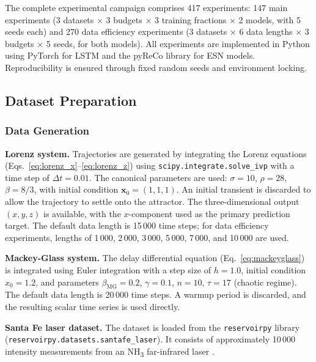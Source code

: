 The complete experimental campaign comprises 417 experiments: 147 main experiments (3 datasets $\times$ 3 budgets $\times$ 3 training fractions $\times$ 2 models, with 5 seeds each) and 270 data efficiency experiments (3 datasets $\times$ 6 data lengths $\times$ 3 budgets $\times$ 5 seeds, for both models). All experiments are implemented in Python using PyTorch for LSTM and the pyReCo library for ESN models. Reproducibility is ensured through fixed random seeds and environment locking.

\subsection{Dataset Preparation}
\label{sec:data_prep}

\subsubsection{Data Generation}
\label{sec:data_gen}

\textbf{Lorenz system.} Trajectories are generated by integrating the Lorenz equations (Eqs.~\ref{eq:lorenz_x}--\ref{eq:lorenz_z}) using \texttt{scipy.integrate.solve\_ivp} with a time step of $\Delta t = 0.01$. The canonical parameters are used: $\sigma = 10$, $\rho = 28$, $\beta = 8/3$, with initial condition $\mathbf{x}_0 = (1, 1, 1)$. An initial transient is discarded to allow the trajectory to settle onto the attractor. The three-dimensional output $(x, y, z)$ is available, with the $x$-component used as the primary prediction target. The default data length is 15\,000 time steps; for data efficiency experiments, lengths of 1\,000, 2\,000, 3\,000, 5\,000, 7\,000, and 10\,000 are used.

\textbf{Mackey-Glass system.} The delay differential equation (Eq.~\ref{eq:mackeyglass}) is integrated using Euler integration with a step size of $h = 1.0$, initial condition $x_0 = 1.2$, and parameters $\beta_{\text{MG}} = 0.2$, $\gamma = 0.1$, $n = 10$, $\tau = 17$ (chaotic regime). The default data length is 20\,000 time steps. A warmup period is discarded, and the resulting scalar time series is used directly.

\textbf{Santa Fe laser dataset.} The dataset is loaded from the \texttt{reservoirpy} library (\texttt{reservoirpy.datasets.santafe\_laser}). It consists of approximately 10\,000 intensity measurements from an NH\textsubscript{3} far-infrared laser \cite{weigend1994time}.

